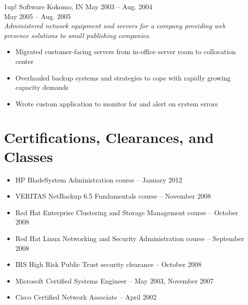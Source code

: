 \documentclass[9pt]{extarticle} %
\begin{document}
\bigskip


\begin{minipage}[c]{\textwidth}

	\begin{indented}
		1up! Software \tab Kokomo, IN \tab May 2003 -- Aug. 2004\\
		\tab \tab \tab May 2005 -- Aug. 2005\\
		\textit{Administered network equipment and servers for a company providing web presence solutions to small publishing companies.}
		\begin{itemize}
			\item Migrated customer-facing servers from in-office server room to collocation center
			\item Overhauled backup systems and strategies to cope with rapidly growing capacity demands
			\item Wrote custom application to monitor for and alert on system errors
		\end{itemize}
	\end{indented}
\end{minipage}


\section{Certifications, Clearances, and Classes}

\begin{indented}
	\begin{itemize}
		\item HP BladeSystem Administration course -- January 2012
		\item VERITAS NetBackup 6.5 Fundamentals course -- November 2008
		\item Red Hat Enterprise Clustering and Storage Management course -- October 2008
		\item Red Hat Linux Networking and Security Administration course -- September 2008
		\item IRS High Risk Public Trust security clearance -- October 2008
		\item Microsoft Certified Systems Engineer -- May 2003, November 2007
		\item Cisco Certified Network Associate -- April 2002
	\end{itemize}
\end{indented}
\end{document}
